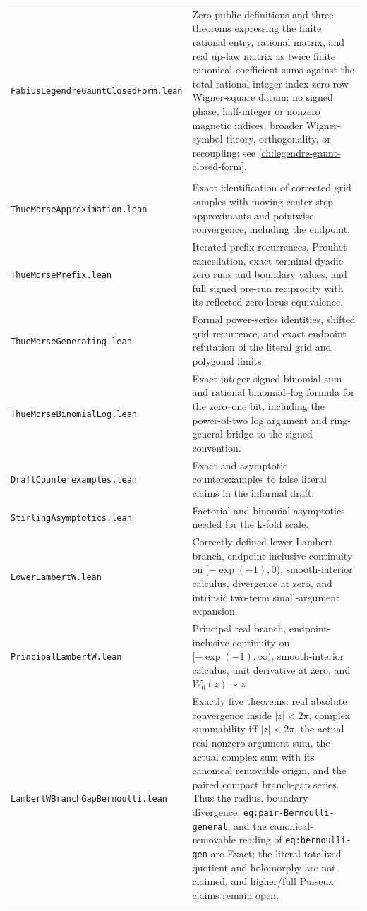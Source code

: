 \documentclass[11pt,oneside]{article}
\theoremstyle{definition}
\theoremstyle{remark}
\begin{document}
\begin{longtable}{>{\raggedright\arraybackslash}p{} >{\raggedright\arraybackslash}p{}}
\nolinkurl{FabiusLegendreGauntClosedForm.lean} & Zero public definitions and three theorems expressing the finite rational entry, rational matrix, and real up-law matrix as twice finite canonical-coefficient sums against the total rational integer-index zero-row Wigner-square datum; no signed phase, half-integer or nonzero magnetic indices, broader Wigner-symbol theory, orthogonality, or recoupling; see \cref{ch:legendre-gaunt-closed-form}. \\
\addlinespace[0.45em]
\multicolumn{2}{l}{\textbf{K-fold Thue--Morse audit and auxiliary asymptotics}}\\[0.25em]
\nolinkurl{ThueMorseApproximation.lean} & Exact identification of corrected grid samples with moving-center step approximants and pointwise convergence, including the endpoint. \\
\nolinkurl{ThueMorsePrefix.lean} & Iterated prefix recurrences, Prouhet cancellation, exact terminal dyadic zero runs and boundary values, and full signed pre-run reciprocity with its reflected zero-locus equivalence. \\
\nolinkurl{ThueMorseGenerating.lean} & Formal power-series identities, shifted grid recurrence, and exact endpoint refutation of the literal grid and polygonal limits. \\
\nolinkurl{ThueMorseBinomialLog.lean} & Exact integer signed-binomial sum and rational binomial--log formula for the zero--one bit, including the power-of-two log argument and ring-general bridge to the signed convention. \\
\nolinkurl{DraftCounterexamples.lean} & Exact and asymptotic counterexamples to false literal claims in the informal draft. \\
\nolinkurl{StirlingAsymptotics.lean} & Factorial and binomial asymptotics needed for the k-fold scale. \\
\nolinkurl{LowerLambertW.lean} & Correctly defined lower Lambert branch, endpoint-inclusive continuity on \([-\exp(-1),0)\), smooth-interior calculus, divergence at zero, and intrinsic two-term small-argument expansion. \\
\nolinkurl{PrincipalLambertW.lean} & Principal real branch, endpoint-inclusive continuity on \([-\exp(-1),\infty)\), smooth-interior calculus, unit derivative at zero, and \(W_0(z)\sim z\). \\
\nolinkurl{LambertWBranchGapBernoulli.lean} & Exactly five theorems: real absolute convergence inside \(\lvert z\rvert<2\pi\), complex summability iff \(\lvert z\rvert<2\pi\), the actual real nonzero-argument sum, the actual complex sum with its canonical removable origin, and the paired compact branch-gap series.  Thus the radius, boundary divergence, \nolinkurl{eq:pair-Bernoulli-general}, and the canonical-removable reading of \nolinkurl{eq:bernoulli-gen} are Exact; the literal totalized quotient and holomorphy are not claimed, and higher/full Puiseux claims remain open. \\

\end{longtable}
\end{document}
